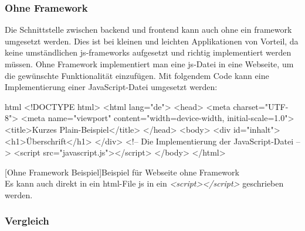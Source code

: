 \subsubsection{Ohne Framework}
Die Schnittstelle zwischen \Gls{backend} und \Gls{frontend} kann auch ohne ein \Gls{framework} umgesetzt werden. Dies ist bei kleinen und leichten Applikationen von Vorteil, da keine umständlichen \Gls{js}-\Gls{framework}s aufgesetzt und richtig implementiert werden müssen. Ohne Framework implementiert man eine \Gls{js}-Datei in eine Webseite, um die gewünschte Funktionalität einzufügen. Mit folgendem Code kann eine Implementierung einer JavaScript-Datei umgesetzt werden:
\begin{code}{html}
	<!DOCTYPE html>
	<html lang="de">
		<head>
			<meta charset="UTF-8">
			<meta name="viewport" content="width=device-width, initial-scale=1.0">
			<title>Kurzes Plain-Beispiel</title>
		</head>
		<body>
			<div id="inhalt">
				<h1>Überschrift</h1>
			</div>
			<!-- Die Implementierung der JavaScript-Datei -->
			<script src="javascript.js"></script>
		</body>
	</html>
\end{code}
[Ohne Framework Beispiel]{Beispiel für Webseite ohne Framework}~\\
Es kann auch direkt in ein \Gls{html}-File \Gls{js} in ein \textit{<script></script>} geschrieben werden.
\newpage
\subsubsection{Vergleich}

